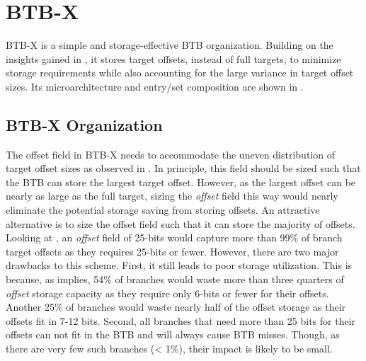 \section{BTB-X}
\label{hpca:sec:design}

BTB-X is a simple and storage-effective BTB organization. Building on the insights gained in , it stores target offsets, instead of full targets, to minimize storage requirements while also accounting for the large variance in target offset sizes. Its microarchitecture and entry/set composition are shown in .

\subsection{BTB-X Organization}

The offset field in BTB-X needs to accommodate the uneven distribution of target offset sizes as observed in . In principle, this field should be sized such that the BTB can store the largest target offset. However, as the largest offset can be nearly as large as the full target, sizing the \textit{offset} field this way would nearly eliminate the potential storage saving from storing offsets. An attractive alternative is to size the offset field such that it can store the majority of offsets. Looking at , an \textit{offset} field of 25-bits would capture more than 99\% of branch target offsets as they requires 25-bits or fewer. However, there are two major drawbacks to this scheme. First, it still leads to poor storage utilization. This is because, as  implies, 54\% of branches would waste more than three quarters of \textit{offset} storage capacity as they require only 6-bits or fewer for their offsets. Another 25\% of branches would waste nearly half of the offset storage as their offsets fit in 7-12 bits. Second, all branches that need more than 25 bits for their offsets can not fit in the BTB and will always cause BTB misses. Though, as there are very few such branches (< 1\%), their impact is likely to be small.

